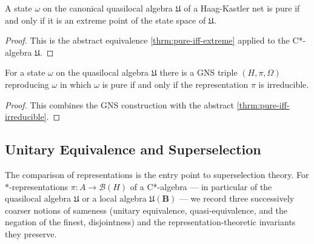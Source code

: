 \begin{theorem}
    \label{thrm:pure-iff-extreme-quasilocal}
    \leanok
    A state $\omega$ on the canonical quasilocal algebra $\mathfrak{U}$ of a Haag-Kastler net is pure if and only if it is an extreme point of the state space of $\mathfrak{U}$.
\end{theorem}
\begin{proof}
    \leanok
    This is the abstract equivalence \ref{thrm:pure-iff-extreme} applied to the C*-algebra $\mathfrak{U}$.
\end{proof}

\begin{theorem}
    \label{thrm:pure-iff-irreducible-quasilocal}
    \leanok
    For a state $\omega$ on the quasilocal algebra $\mathfrak{U}$ there is a GNS triple $(H, \pi, \Omega)$ reproducing $\omega$ in which $\omega$ is pure if and only if the representation $\pi$ is irreducible.
\end{theorem}
\begin{proof}
    \leanok
    This combines the GNS construction with the abstract \ref{thrm:pure-iff-irreducible}.
\end{proof}

\subsection{Unitary Equivalence and Superselection}

The comparison of representations is the entry point to superselection theory. For $*$-representations $\pi : A \to \mathcal{B}(H)$ of a C*-algebra --- in particular of the quasilocal algebra $\mathfrak{U}$ or a local algebra $\mathfrak{U}(\mathbf{B})$ --- we record three successively coarser notions of sameness (unitary equivalence, quasi-equivalence, and the negation of the finest, disjointness) and the representation-theoretic invariants they preserve.

